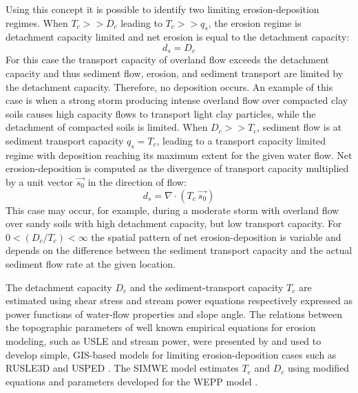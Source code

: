 \documentclass[gmd, manuscript]{copernicus}
\begin{document}
Using this concept it is possible to identify 
two limiting erosion-deposition regimes.
When $T_c >> D_c$ leading to $T_c >> q_s$, 
the erosion regime is detachment capacity limited and
net erosion is equal to the detachment capacity:
\begin{equation}
\label{eq:detachment_limited}
 d_s = D_c
\end{equation}
For this case the transport capacity of overland flow 
exceeds the detachment capacity 
and thus sediment flow, erosion, and sediment transport
are limited by the detachment capacity. 
Therefore, no deposition occurs.
An example of this case is when a strong storm 
producing intense %
overland flow over compacted clay soils 
causes high capacity flows to transport light clay particles,
while the detachment of compacted soils is limited.
%
When $D_c >> T_c$, sediment flow is at sediment transport capacity $q_s = T_c$, 
leading to a transport capacity limited regime 
with deposition reaching its maximum extent for the given water flow. 
Net erosion-deposition is computed as the divergence of
transport capacity multiplied by a unit vector $\vec{s_0}$ 
in the direction of flow:
\begin{equation}
\label{eq:transport_limited}
 d_s = \nabla\cdot (T_c ~ \vec{s_0})
\end{equation}
This case may occur, for example, during a moderate storm 
with overland flow over sandy soils 
with high detachment capacity, but low transport capacity.
%
For $0 < ({D_c / T_c}) < \infty$ 
the spatial pattern of net erosion-deposition is variable 
and depends on the difference between the sediment transport capacity 
and the actual sediment flow rate at the given location.

The detachment capacity $D_c $  and the sediment-transport capacity $T_c $  
are estimated using shear stress and stream power equations respectively
expressed as power functions of water-flow properties and slope angle.    
The relations between the topographic parameters 
of well known empirical equations for erosion modeling, 
such as USLE and stream power, were presented by \citep{Moore1986} 
and used to develop simple, GIS-based models for limiting erosion-deposition cases 
such as RUSLE3D and USPED \citep{Mitasova2001}.
The SIMWE model estimates $T_c$ and $D_c$ using modified 
equations and parameters developed for the WEPP model 
\citep{Flanagan2013,Mitasova2013}.
\end{document}
